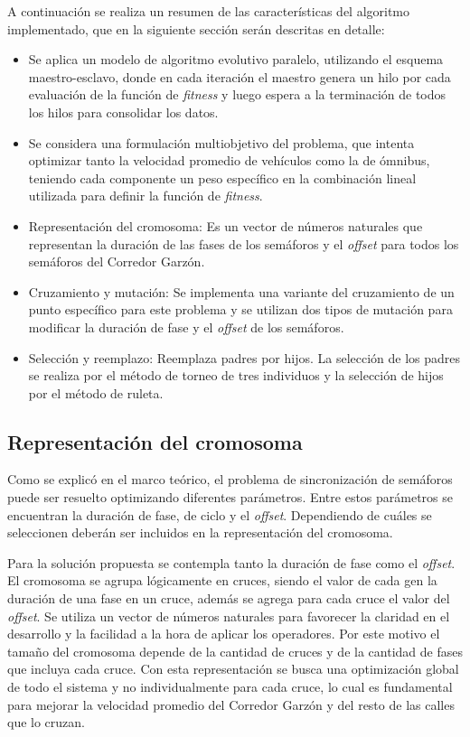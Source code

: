 A continuación se realiza un resumen de las características del algoritmo implementado, que en la siguiente sección serán descritas en detalle:
\begin{itemize}
	
	\item Se aplica un modelo de algoritmo evolutivo paralelo, utilizando el esquema maestro-esclavo, donde en cada iteración el maestro genera un hilo por cada evaluación de la función de \emph{fitness} y luego espera a la terminación de todos los hilos para consolidar los datos. 
	\item Se considera una formulación multiobjetivo del problema, que intenta optimizar tanto la velocidad promedio de vehículos como la de ómnibus, teniendo cada componente un peso específico en la combinación lineal utilizada para definir la función de \emph{fitness}.
	\item Representación del cromosoma: Es un vector de números naturales que representan la duración de las fases de los semáforos y el \emph{offset} para todos los semáforos del Corredor Garzón.
	\item Cruzamiento y mutación: Se implementa una variante del cruzamiento de un punto específico para este problema y se utilizan dos tipos de mutación para modificar la duración de fase y el \emph{offset} de los semáforos.
	\item Selección y reemplazo: Reemplaza padres por hijos. La selección de los padres se realiza por el método de torneo de tres individuos y la selección de hijos por el método de ruleta.
	
\end{itemize}

\subsection{Representación del cromosoma}

Como se explicó en el marco teórico, el problema de sincronización de semáforos puede ser resuelto optimizando diferentes parámetros. Entre estos parámetros se encuentran la duración de fase, de ciclo y el \emph{offset}. Dependiendo de cuáles se seleccionen deberán ser incluidos en la representación del cromosoma.

Para la solución propuesta se contempla tanto la duración de fase como el \emph{offset}. El cromosoma se agrupa lógicamente en cruces, siendo el valor de cada gen la duración de una
fase en un cruce, además se agrega para cada cruce el valor del \emph{offset}. Se utiliza un vector de números naturales para favorecer la claridad en el desarrollo y la facilidad a la hora de aplicar los operadores. Por este motivo el tamaño del cromosoma depende de la cantidad de cruces y de la cantidad de fases que incluya cada cruce. Con esta representación se busca una optimización global de todo el sistema y no individualmente para cada cruce, lo cual es fundamental para mejorar la velocidad promedio del Corredor Garzón y del resto de las calles que lo cruzan.

